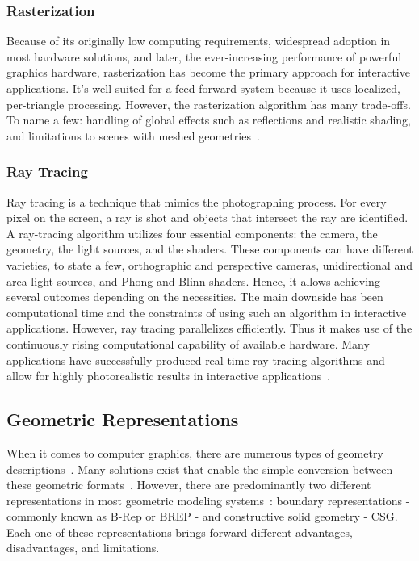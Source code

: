\documentclass[a4paper,11pt,oneside]{article}
\begin{document}
\subsubsection{Rasterization}
    
Because of its originally low computing requirements, widespread adoption in most hardware solutions, and later, the ever-increasing performance of powerful graphics hardware, rasterization has become the primary approach for interactive applications. It's well suited for a feed-forward system because it uses localized, per-triangle processing. However, the rasterization algorithm has many trade-offs. To name a few: handling of global effects such as reflections and realistic shading, and limitations to scenes with meshed geometries~\cite{rasterization_scratch_pixel}.
    
\subsubsection{Ray Tracing}
     
Ray tracing is a technique that mimics the photographing process. For every pixel on the screen, a ray is shot and objects that intersect the ray are identified. A ray-tracing algorithm utilizes four essential components: the camera, the geometry, the light sources, and the shaders. These components can have different varieties, to state a few, orthographic and perspective cameras, unidirectional and area light sources, and Phong and Blinn shaders. Hence, it allows achieving several outcomes depending on the necessities. The main downside has been computational time and the constraints of using such an algorithm in interactive applications. However, ray tracing parallelizes efficiently. Thus it makes use of the continuously rising computational capability of available hardware. Many applications have successfully produced real-time ray tracing algorithms and allow for highly photorealistic results in interactive applications~\cite{RT_RT1, RT_RT2}.
    
  
\subsection{Geometric Representations}
\label{sec:geometric_represections}

When it comes to computer graphics, there are numerous types of geometry descriptions~\cite{SOLIDREP_5, SOLIDREP_1, SOLIDREP_2, SOLIDREP_3, COMPUTING_SURVEYS,SOLIDREP_4}. Many solutions exist that enable the simple conversion between these geometric formats~\cite{steuer_2012}. However, there are predominantly two different representations in most geometric modeling systems~\cite{COMPUTING_SURVEYS}: boundary representations - commonly known as B-Rep or BREP - and constructive solid geometry - CSG. Each one of these representations brings forward different advantages, disadvantages, and limitations.
    
\end{document}
